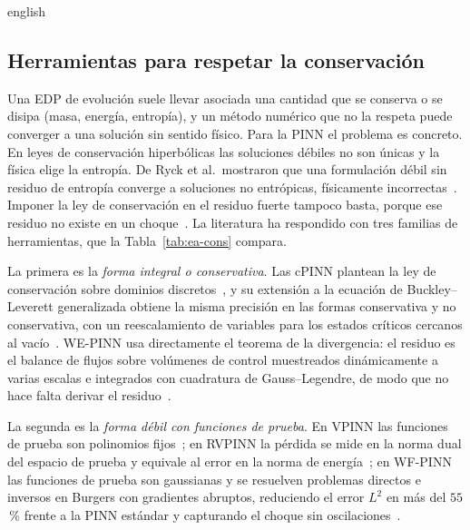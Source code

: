 \documentclass[0000.tex]{subfiles}
\begin{document}
\begin{hyphenrules}{english}
\subsection{Herramientas para respetar la conservación}
\label{subsec:ea-cons}

Una EDP de evolución suele llevar asociada una cantidad que se conserva o se disipa (masa, energía, entropía), y un método numérico que no la respeta puede converger a una solución sin sentido físico. Para la PINN el problema es concreto. En leyes de conservación hiperbólicas las soluciones débiles no son únicas y la física elige la entropía. De Ryck et al.\ mostraron que una formulación débil sin residuo de entropía converge a soluciones no entrópicas, físicamente incorrectas~\cite{de2024wpinns}. Imponer la ley de conservación en el residuo fuerte tampoco basta, porque ese residuo no existe en un choque~\cite{chaumet2024improving}. La literatura ha respondido con tres familias de herramientas, que la Tabla~\ref{tab:ea-cons} compara.

La primera es la \emph{forma integral o conservativa}. Las cPINN plantean la ley de conservación sobre dominios discretos~\cite{jagtap2020conservative}, y su extensión a la ecuación de Buckley--Leverett generalizada obtiene la misma precisión en las formas conservativa y no conservativa, con un reescalamiento de variables para los estados críticos cercanos al vacío~\cite{quita2023conservative}. WE-PINN usa directamente el teorema de la divergencia: el residuo es el balance de flujos sobre volúmenes de control muestreados dinámicamente a varias escalas e integrados con cuadratura de Gauss--Legendre, de modo que no hace falta derivar el residuo~\cite{oubarka2026weak}.

La segunda es la \emph{forma débil con funciones de prueba}. En VPINN las funciones de prueba son polinomios fijos~\cite{kharazmi2019vpinns}; en RVPINN la pérdida se mide en la norma dual del espacio de prueba y equivale al error en la norma de energía~\cite{rojas2024robust}; en WF-PINN las funciones de prueba son gaussianas y se resuelven problemas directos e inversos en Burgers con gradientes abruptos, reduciendo el error $L^2$ en más del $55$\,\% frente a la PINN estándar y capturando el choque sin oscilaciones~\cite{wang2025wf}.


\end{hyphenrules}
\end{document}
